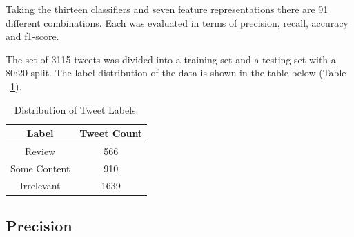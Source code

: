 Taking the thirteen classifiers and seven feature representations there are 91 different combinations. Each was evaluated in terms of precision, recall, accuracy and f1-score.

The set of 3115 tweets was divided into a training set and a testing set with a 80:20 split. The label distribution of the data is shown in the table below (Table ~\ref{Table:tweetlabels}).

\begin{table}[h!]
\setlength\extrarowheight{5pt}
\caption{Distribution of Tweet Labels.}
\label{Table:tweetlabels}
\begin{tabular}{|c|c|}
\hline
\textbf{Label} & \textbf{Tweet Count} \\ \hline
Review         & 566                  \\ \hline
Some Content   & 910                  \\ \hline
Irrelevant     & 1639                 \\ \hline
\end{tabular}
\end{table}

\subsection{Precision}

